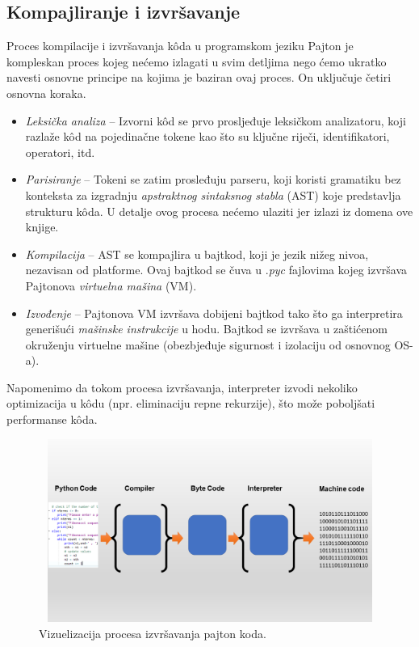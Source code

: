 \subsection{Kompajliranje i izvršavanje}

Proces kompilacije   i izvršavanja k\^oda u programskom jeziku Pajton je kompleskan proces kojeg nećemo izlagati u svim detljima nego ćemo ukratko navesti osnovne principe na kojima je baziran ovaj proces. On uključuje četiri osnovna koraka.

\begin{itemize}
	\item \textit{Leksička analiza} -- Izvorni k\^od se prvo prosljeđuje leksičkom analizatoru,  koji razlaže k\^od na pojedinačne tokene kao što su ključne riječi, identifikatori, operatori, itd.
	\item \textit{Parisiranje} -- Tokeni se zatim prosleđuju parseru, koji koristi gramatiku bez konteksta za izgradnju \emph{apstraktnog sintaksnog stabla} (AST) koje predstavlja strukturu k\^oda. U detalje ovog procesa nećemo ulaziti jer izlazi iz domena ove knjige.
	\item \textit{Kompilacija} -- AST se kompajlira u bajtkod, koji je jezik nižeg nivoa,   nezavisan od platforme.  Ovaj bajtkod se čuva u .\textit{pyc} fajlovima kojeg izvršava   Pajtonova \textit{virtuelna mašina} (VM).
	\item \textit{Izvođenje} -- Pajtonova VM izvršava dobijeni bajtkod tako što ga interpretira generišući \textit{mašinske instrukcije} u hodu. Bajtkod se izvršava u zaštićenom okruženju virtuelne mašine (obezbjeđuje sigurnost i izolaciju od osnovnog OS-a).  
	
\end{itemize}
Napomenimo da tokom procesa izvršavanja, interpreter izvodi nekoliko optimizacija u k\^odu (npr. eliminaciju repne rekurzije), što može poboljšati performanse k\^oda.
\begin{figure}[H]	
	\centering
	
	\includegraphics[width=350pt,height=170pt]{slike/python-code-copiler-machine-code.png}%
\caption{Vizuelizacija procesa izvršavanja pajton koda.\protect\footnotemark}
\label{fig:comp_interpreting}
\end{figure}

